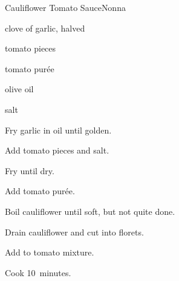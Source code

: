 \begin{recipe}{Cauliflower Tomato Sauce}{Nonna}{}

\begin{ingredients}
\item clove of garlic, halved
\item {}
\item tomato pieces
\item tomato purée
\item olive oil
\item salt
\end{ingredients}

\begin{directions}
\item Fry garlic in oil until golden.
\item Add tomato pieces and salt.
\item Fry until dry.
\item Add tomato purée.
\item Boil cauliflower until soft, but not quite done.
\item Drain cauliflower and cut into florets.
\item Add to tomato mixture.
\item Cook 10~minutes.
\end{directions}

\end{recipe}
